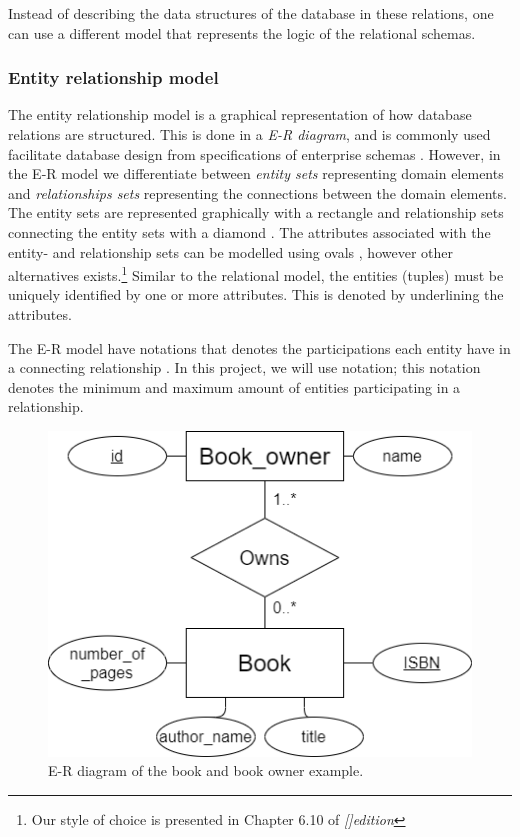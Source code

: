 Instead of describing the data structures of the database in these relations, one can use a different model that represents the logic of the relational schemas.

\subsubsection{Entity relationship model}\label{sec:EntityRelationModel}
The entity relationship model is a graphical representation of how database relations are structured.
This is done in a \textit{E-R diagram}, and is commonly used facilitate database design from specifications of enterprise schemas \cite*[Chapter 6.2]{DBSBook}.
However, in the E-R model we differentiate between \textit{entity sets} representing domain elements and \textit{relationships sets} representing the connections between the domain elements. 
The entity sets are represented graphically with a rectangle and relationship sets connecting the entity sets with a diamond \cite[Chapter 6.2]{DBSBook}.
The attributes associated with the entity- and relationship sets can be modelled using ovals \cite{KatjaFirstPP}, however other alternatives exists.\footnote{Our style of choice is presented in Chapter 6.10 of  \textit{[]{edition}}}
Similar to the relational model, the entities (tuples) must be uniquely identified by one or more attributes. This is denoted by underlining the attributes. 

The E-R model have notations that denotes the participations each entity have in a connecting relationship \cite[Chapter 6.4]{DBSBook}.
In this project, we will use  notation; this notation denotes the minimum and maximum amount of entities participating in a relationship. 

\begin{figure}[htp]
    \centering
    \includegraphics[scale=0.5]{Images/book_example_w_cardinality.png}
    \caption{E-R diagram of the book and book owner example.}
    \label{fig:ER_Book_Example}
\end{figure}


